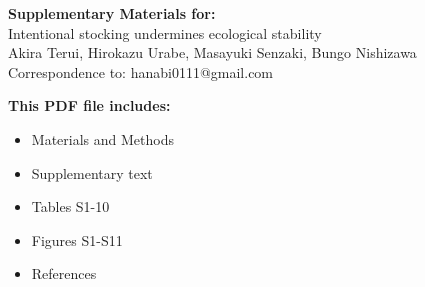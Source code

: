 \begin{center}
\LARGE{\textbf{Supplementary Materials for:}}\\[7.5mm]
\LARGE{Intentional stocking undermines ecological stability}\\[7.5mm]
\large{Akira Terui, Hirokazu Urabe, Masayuki Senzaki, Bungo Nishizawa}\\[7.5mm]
\large{Correspondence to: hanabi0111@gmail.com}\\[15mm]
\end{center}
\begin{flushleft}
\textbf{This PDF file includes:}
\begin{itemize}
\item Materials and Methods
\item Supplementary text
\item Tables S1-10
\item Figures S1-S11
\item References
\end{itemize}
\end{flushleft}

\newpage